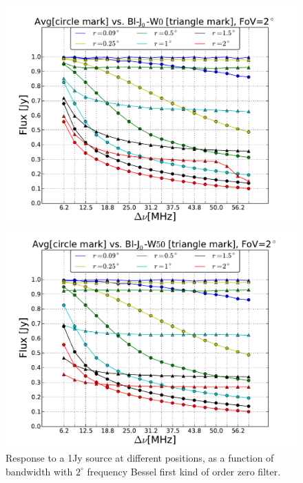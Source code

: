 \documentclass[useAMS,usenatbib]{mn2e}
\begin{document}
\begin{figure}
\begin{minipage}{0.36\linewidth}
      \label{fig:max-integ-freq-sinc-w1x50-fov2}
      \end{minipage}\\
\begin{minipage}{0.36\linewidth}\includegraphics[width=1\textwidth]{./Figures/max-integ-freq-bessel-w1x1-fov2.pdf}
      \caption{Response to a 1Jy source at different positions, as a function of bandwidth with $2^{\circ}$ frequency Bessel first kind of 
order zero filter.}
      \label{fig:max-integ-freq-bessel-w1x1-fov2}
      \end{minipage}
\hspace{1cm}
\begin{minipage}{0.36\linewidth}\includegraphics[width=1\textwidth]{./Figures/max-integ-freq-bessel-w1x50-fov2.pdf}

\end{minipage}
\end{figure}
\end{document}
